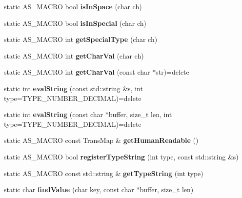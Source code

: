 \begin{DoxyCompactItemize}
\mbox{\label{class_lexical_parser_a177c7103e060000af11aedfda6b32cd1}} 
static A\+S\+\_\+\+M\+A\+C\+RO bool {\bfseries is\+In\+Space} (char ch)
\item 
\mbox{\label{class_lexical_parser_aa450782361db02179cc50ce767153f4f}} 
static A\+S\+\_\+\+M\+A\+C\+RO bool {\bfseries is\+In\+Special} (char ch)
\item 
\mbox{\label{class_lexical_parser_a09d89b3e5918613cc95d5a551d5055c4}} 
static A\+S\+\_\+\+M\+A\+C\+RO int {\bfseries get\+Special\+Type} (char ch)
\item 
\mbox{\label{class_lexical_parser_a7a6f196c85b2cbc87cadb7ca2d945635}} 
static A\+S\+\_\+\+M\+A\+C\+RO int {\bfseries get\+Char\+Val} (char ch)
\item 
\mbox{\label{class_lexical_parser_a5fc4389bf24e656bcda31e0e4cd12fff}} 
static A\+S\+\_\+\+M\+A\+C\+RO int {\bfseries get\+Char\+Val} (const char $\ast$str)=delete
\item 
\mbox{\label{class_lexical_parser_a1116e6dd8fc2d2af3c130304e79c5286}} 
static int {\bfseries eval\+String} (const std\+::string \&s, int type=T\+Y\+P\+E\+\_\+\+N\+U\+M\+B\+E\+R\+\_\+\+D\+E\+C\+I\+M\+AL)=delete
\item 
\mbox{\label{class_lexical_parser_a098bd59e9e2975320034afcfc41e0fd4}} 
static int {\bfseries eval\+String} (const char $\ast$buffer, size\+\_\+t len, int type=T\+Y\+P\+E\+\_\+\+N\+U\+M\+B\+E\+R\+\_\+\+D\+E\+C\+I\+M\+AL)=delete
\item 
\mbox{\label{class_lexical_parser_adae63b5af6be9c93f08c1fbd0a0813a8}} 
static A\+S\+\_\+\+M\+A\+C\+RO const Trans\+Map \& {\bfseries get\+Human\+Readable} ()
\item 
\mbox{\label{class_lexical_parser_a00037c204ba0f3518960bee99d06e63e}} 
static A\+S\+\_\+\+M\+A\+C\+RO bool {\bfseries register\+Type\+String} (int type, const std\+::string \&s)
\item 
\mbox{\label{class_lexical_parser_a508c217f6fe8876f4a9af6e9e54c5ed6}} 
static A\+S\+\_\+\+M\+A\+C\+RO const std\+::string \& {\bfseries get\+Type\+String} (int type)
\item 
\mbox{\label{class_lexical_parser_ae3eeac3e10f5be9163da349ebf3d4dd5}} 
static char {\bfseries find\+Value} (char key, const char $\ast$buffer, size\+\_\+t len)
\end{DoxyCompactItemize}

